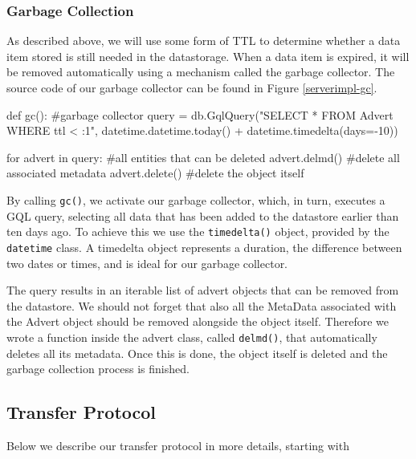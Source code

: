 \subsubsection{Garbage Collection}
As described above, we will use some form of TTL to determine whether a data item
stored is still needed in the datastorage. When a data item is expired, it will
be removed automatically using a mechanism called the garbage collector.
The source code of our garbage collector can be found in Figure
\ref{serverimpl-gc}.

\begin{figure*}[ht] %
\begin{center}
\begin{code}
def gc(): #garbage collector
  query = db.GqlQuery("SELECT * FROM Advert WHERE ttl < :1", 
                      datetime.datetime.today() + datetime.timedelta(days=-10))
  
  for advert in query: #all entities that can be deleted
    advert.delmd()     #delete all associated metadata
    advert.delete()    #delete the object itself
\end{code}
\caption{The Garbage Collector.\label{serverimpl-gc}}
\end{center}
\end{figure*}

By calling \texttt{gc()}, we activate our garbage collector, which, in turn,
executes a GQL query, selecting all data that has been added to the datastore
earlier than ten days ago. To achieve this we use the \texttt{timedelta()}
object, provided by the \texttt{datetime} class. A timedelta object
represents a duration, the difference between two dates or times, and is ideal
for our garbage collector.

The query results in an iterable list of advert objects that can be removed
from the datastore. We should not forget that also all the MetaData
associated with the Advert object should be removed alongside the object itself.
Therefore we wrote a function inside the advert class, called \texttt{delmd()},
that automatically deletes all its metadata. Once this is done, the object
itself is deleted and the garbage collection process is finished.

\subsection{Transfer Protocol}
Below we describe our transfer protocol in more details, starting with 
      
